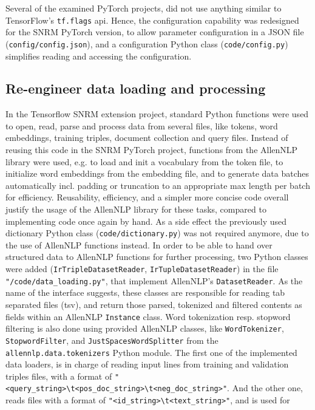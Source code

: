 Several of the examined PyTorch projects, did not use anything similar to TensorFlow's
    \texttt{tf.flags} api.
Hence, the configuration capability was redesigned for the SNRM PyTorch version,
    to allow parameter configuration in a JSON file (\texttt{config/config.json}),
    and a configuration Python class (\texttt{code/config.py}) simplifies
    reading and accessing the configuration.

\subsection{Re-engineer data loading and processing}
In the Tensorflow SNRM extension project, standard Python functions were used 
    to open, read, parse and process data from several files, 
    like tokens, word embeddings, training triples, document collection 
    and query files.
Instead of reusing this code in the SNRM PyTorch project, functions from the
    AllenNLP library were used, e.g. to load and init a vocabulary from the token file,
    to initialize word embeddings from the embedding file,
    and to generate data batches automatically incl. padding or truncation 
    to an appropriate max length per batch for efficiency.
Reusability, efficiency, and a simpler more concise code overall justify the usage of the 
    AllenNLP library for these tasks, compared to implementing code once again by hand.
As a side effect the previously used dictionary Python class (\texttt{code/dictionary.py}) was not
    required anymore, due to the use of AllenNLP functions instead.
In order to be able to hand over structured data to AllenNLP functions for further processing, 
    two Python classes were added (\texttt{IrTripleDatasetReader}, \texttt{IrTupleDatasetReader})
    in the file \texttt{"/code/data\_loading.py"}, that implement AllenNLP's \texttt{DatasetReader}.
As the name of the interface suggests, these classes are responsible for reading tab separated files (tsv),
    and return those parsed, tokenized and filtered contents as fields within an AllenNLP \texttt{Instance} class.
Word tokenization resp. stopword filtering is also done using provided AllenNLP classes, 
    like \texttt{WordTokenizer}, \texttt{StopwordFilter}, and \texttt{JustSpacesWordSplitter} from the
    \texttt{allennlp.data.tokenizers} Python module.
The first one of the implemented data loaders, is in charge of reading input lines from training and validation
    triples files, with a format of \verb|"<query_string>\t<pos_doc_string>\t<neg_doc_string>"|.
And the other one, reads files with a format of \verb|"<id_string>\t<text_string>"|, and is used for
